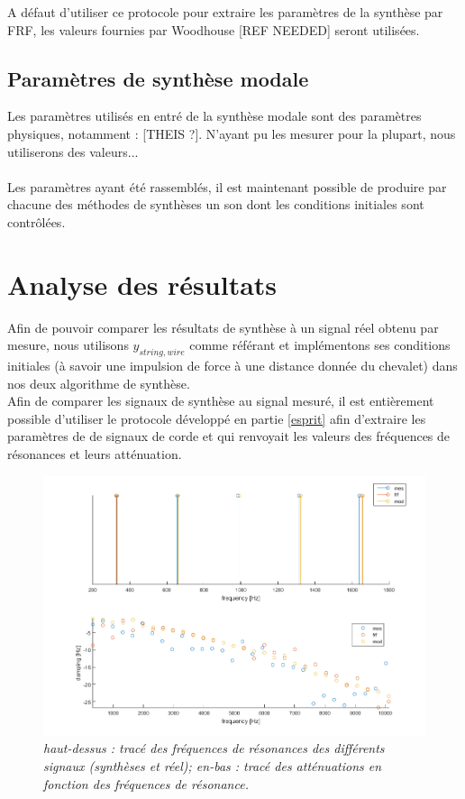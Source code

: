 A défaut d'utiliser ce protocole pour extraire les paramètres de la synthèse par FRF, les valeurs fournies par Woodhouse [REF NEEDED] seront utilisées.

\subsection{Paramètres de synthèse modale}

Les paramètres utilisés en entré de la synthèse modale sont des paramètres physiques, notamment : [THEIS ?]. N'ayant pu les mesurer pour la plupart, nous utiliserons des valeurs...
\\\\

Les paramètres ayant été rassemblés, il est maintenant possible de produire par chacune des méthodes de synthèses un son dont les conditions initiales sont contrôlées.

\section{Analyse des résultats}
Afin de pouvoir comparer les résultats de synthèse à un signal réel obtenu par mesure, nous utilisons $y_{string,wire}$ comme référant et implémentons ses conditions initiales (à savoir une impulsion de force à une distance donnée du chevalet) dans nos deux algorithme de synthèse.\\
Afin de comparer les signaux de synthèse au signal mesuré, il est entièrement possible d'utiliser le protocole développé en partie \ref{esprit} afin d'extraire les paramètres de de signaux de corde et qui renvoyait les valeurs des fréquences de résonances et leurs atténuation.\\

\begin{figure}[h]
\includegraphics[scale=0.65]{figures/apotheose.png}
\caption{\textit{haut-dessus : tracé des fréquences de résonances des différents signaux (synthèses et réel); en-bas : tracé des atténuations en fonction des fréquences de résonance.}}
\label{apo}
\end{figure}

